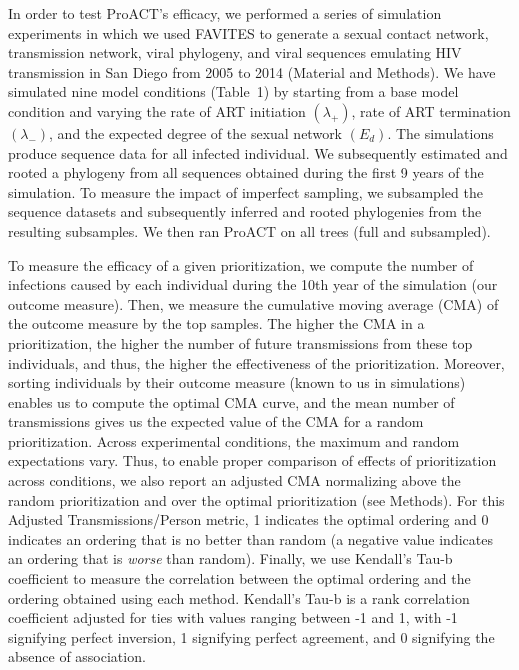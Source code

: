 \documentclass[a4paper,10pt]{article}
\newcommand{\PLWH}{sample\xspace}
\begin{document}
In order to test ProACT's efficacy, we performed a series of simulation experiments in which we used FAVITES \supercite{Moshiri2018} to generate a sexual contact network, transmission network, viral phylogeny, and viral sequences emulating HIV transmission in San Diego from 2005 to 2014 (Material and Methods).
We have simulated nine model conditions (Table~1) by starting from a base model condition and varying the rate of ART initiation $(\lambda_+)$, rate of ART termination $(\lambda_-)$, and the expected degree of the sexual network $(E_d)$.
The simulations produce sequence data for all infected individual. 
We subsequently estimated and rooted a phylogeny from all sequences obtained during the first 9 years of the simulation.
To measure the impact of imperfect sampling, we subsampled the sequence datasets and subsequently inferred and rooted phylogenies from the resulting subsamples.
We then ran ProACT on all trees (full and subsampled).

To measure the efficacy of a given prioritization,
we compute the number of infections caused by each individual during the 10th year of the simulation (our outcome measure).
Then, we measure the cumulative moving average (CMA) of the outcome measure by the top \PLWH{s}. 
The higher the CMA in a prioritization, the higher the number of future transmissions from these {top} individuals, and thus, the higher the effectiveness of the prioritization. 
Moreover, sorting individuals by their outcome measure (known to us in simulations) enables us to compute the optimal CMA curve, and the mean number of transmissions gives us the expected value of the CMA for a random prioritization.
Across experimental conditions, the maximum and random expectations vary.
Thus, to enable proper comparison of {effects of prioritization} across conditions,
we also report an adjusted CMA normalizing above the random prioritization and over the optimal prioritization (see Methods).
For this Adjusted Transmissions/Person metric, 1 indicates the optimal ordering and 0 indicates an ordering that is no better than random (a negative value indicates an ordering that is \textit{worse} than random). 
Finally, we use Kendall's Tau-b coefficient to measure the correlation between the optimal ordering and the ordering obtained using each method. 
Kendall's Tau-b is a rank correlation coefficient adjusted for ties \supercite{Kendall1938} with values ranging between -1 and 1, with -1 signifying perfect inversion, 1 signifying perfect agreement, and 0 signifying the absence of association.
\end{document}
